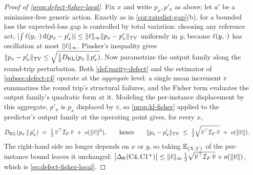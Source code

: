 \begin{proof}[Proof of \cref{prop:defect-fisher-local}]
Fix $x$ and write $p_x,p'_x$ as above; let $a'$ be a minimizer-free generic
action. Exactly as in \cref{cor:ratedist-gap}(b), for a bounded loss the
expected-loss gap is controlled by total variation: choosing any reference act,
$|\!\int\ell(y,\cdot)\,\mathrm{d}(p_x-p'_x)|\le\|\ell\|_\infty\|p_x-p'_x\|_{\mathrm{TV}}$
uniformly in $y$, because $\ell(y,\cdot)$ has oscillation at most
$\|\ell\|_\infty$. Pinsker's inequality gives
$\|p_x-p'_x\|_{\mathrm{TV}}\le\sqrt{\tfrac12D_{\mathrm{KL}}\!\left(p_x \,\Vert\, p'_x\right)}$. Now parametrize the
output family along the round-trip perturbation. Both \cref{def:parity-defect} and
the estimator of \cref{subsec:defect-r4} operate at the \emph{aggregate} level: a
single mean increment $\overline{v}$ summarizes the round trip's structural
failures, and the Fisher term evaluates the output family's quadratic form at it.
Modeling the per-instance displacement by this aggregate, $p'_x$ is $p_x$
displaced by $\overline{v}$, so \cref{prop:kl-fisher} applied to the predictor's
output family at the operating point gives, for every $x$,
\[
  D_{\mathrm{KL}}\!\left(p_x \,\Vert\, p'_x\right)\;=\;\tfrac12\,\overline{v}^\top\mathcal{I}_{F}\,\overline{v}\;+\;o(\|\overline{v}\|^2),
  \qquad\text{hence}\qquad
  \|p_x-p'_x\|_{\mathrm{TV}}\;\le\;\tfrac12\sqrt{\overline{v}^\top\mathcal{I}_{F}\,\overline{v}}\;+\;o(\|\overline{v}\|).
\]
The right-hand side no longer depends on $x$ or $y$, so taking $\mathbb{E}_{(X,Y)}$
of the per-instance bound leaves it unchanged:
$\big|\Delta_{\mathsf{K}}(\mathrm{C}4,\mathrm{C1^{+}})\big|\le
\|\ell\|_\infty\,\tfrac12\sqrt{\overline{v}^\top\mathcal{I}_{F}\,\overline{v}}+o(\|\overline{v}\|)$,
which is \eqref{eq:defect-fisher-local}.
\end{proof}
